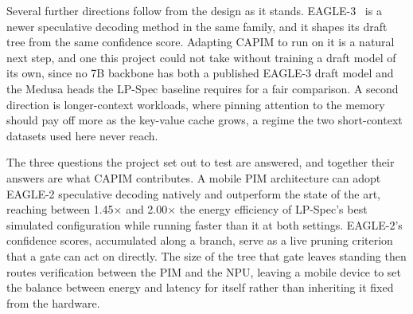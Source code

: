 \documentclass[11pt]{article}
\begin{document}
Several further directions follow from the design as it stands. EAGLE-3~\cite{li2025eagle3} is a newer speculative decoding method in the same family, and it shapes its draft tree from the same confidence score. Adapting CAPIM to run on it is a natural next step, and one this project could not take without training a draft model of its own, since no 7B backbone has both a published EAGLE-3 draft model and the Medusa heads the LP-Spec baseline requires for a fair comparison. A second direction is longer-context workloads, where pinning attention to the memory should pay off more as the key-value cache grows, a regime the two short-context datasets used here never reach.

The three questions the project set out to test are answered, and together their answers are what CAPIM contributes. A mobile PIM architecture can adopt EAGLE-2 speculative decoding natively and outperform the state of the art, reaching between 1.45× and 2.00× the energy efficiency of LP-Spec's best simulated configuration while running faster than it at both settings. EAGLE-2's confidence scores, accumulated along a branch, serve as a live pruning criterion that a gate can act on directly. The size of the tree that gate leaves standing then routes verification between the PIM and the NPU, leaving a mobile device to set the balance between energy and latency for itself rather than inheriting it fixed from the hardware.

\newpage
{}

 
\end{document}
